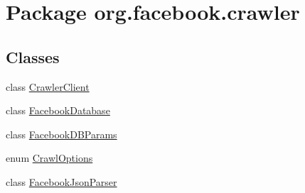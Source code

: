 \hypertarget{namespaceorg_1_1facebook_1_1crawler}{\section{Package org.\-facebook.\-crawler}
\label{namespaceorg_1_1facebook_1_1crawler}
}
\subsection*{Classes}
\begin{DoxyCompactItemize}
\item 
class \hyperlink{classorg_1_1facebook_1_1crawler_1_1_crawler_client}{Crawler\-Client}
\item 
class \hyperlink{classorg_1_1facebook_1_1crawler_1_1_facebook_database}{Facebook\-Database}
\item 
class \hyperlink{classorg_1_1facebook_1_1crawler_1_1_facebook_d_b_params}{Facebook\-D\-B\-Params}
\item 
enum \hyperlink{enumorg_1_1facebook_1_1crawler_1_1_crawl_options}{Crawl\-Options}
\item 
class \hyperlink{classorg_1_1facebook_1_1crawler_1_1_facebook_json_parser}{Facebook\-Json\-Parser}
\end{DoxyCompactItemize}
